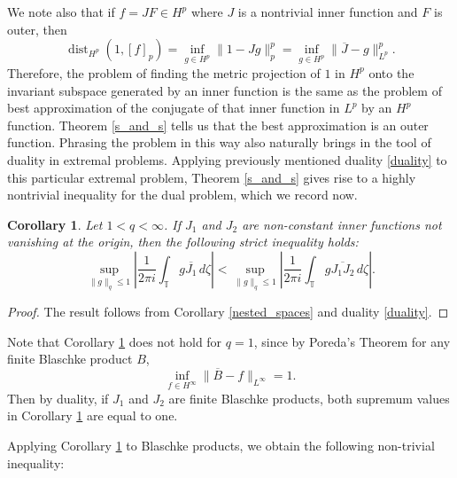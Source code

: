 \documentclass{article}
\theoremstyle{plain}
\numberwithin{Theorem}{section}
\numberwithin{equation}{section}
\theoremstyle{plain}
\newtheorem{Corollary}[Theorem]{Corollary}
\theoremstyle{definition}
\renewcommand{\leq}{\leqslant}
\newcommand{\T}{\mathbb{T}}
\begin{document}
We note also that if $f = J F \in H^p$ where $J$ is a nontrivial inner function and $F$ is outer, then 
\begin{equation*}
\operatorname{dist}_{H^p}(1, [f]_p) = \inf_{g \in H^p} \| 1 - Jg \|_p^p = \inf_{g \in H^p} \| \overline{J} - g \|_{L^p}^p.
\end{equation*}
Therefore, the problem of finding the metric projection of $1$ in $H^p$ onto the invariant subspace generated by an inner function is the same as the problem of best approximation of the conjugate of that inner function in $L^p$ by an $H^p$ function. Theorem \ref{s_and_s} tells us that the best approximation is an outer function. Phrasing the problem in this way also naturally brings in the tool of duality in extremal problems.
Applying previously mentioned duality \eqref{duality} to this particular extremal problem, Theorem \ref{s_and_s} gives rise to a highly nontrivial inequality for the dual problem, which we record now. 

\begin{Corollary}\label{J_Ineq}
    Let $ 1 < q < \infty$. If $J_1$ and $J_2$ are non-constant inner functions not vanishing at the origin, then the following strict inequality holds:
    \begin{equation*}
        \sup_{\|g\|_q \leq 1} \left| \frac{1}{2 \pi i} \int_{\T} g \overline{J_1} \, d \zeta \right| <    \sup_{\|g\|_q \leq 1} \left| \frac{1}{2 \pi i} \int_{\T} g \overline{J_1 J_2} \, d \zeta \right|.
    \end{equation*}
\end{Corollary}

\begin{proof}
 The result follows from Corollary \ref{nested_spaces} and duality \eqref{duality}. 
\end{proof}
Note that Corollary \ref{J_Ineq} does not hold for $q = 1$, since by Poreda's Theorem \cite{Po76} for any finite Blaschke product $B$, 
\begin{equation*}
    \inf_{f \in H^{\infty}} \|\overline{B} - f \|_{L^{\infty}} = 1.
\end{equation*}
Then by duality, if $J_1$ and $J_2$ are finite Blaschke products, both supremum values in Corollary \ref{J_Ineq} are equal to one.

Applying Corollary \ref{J_Ineq} to Blaschke products, we obtain the following non-trivial inequality:
\end{document}
